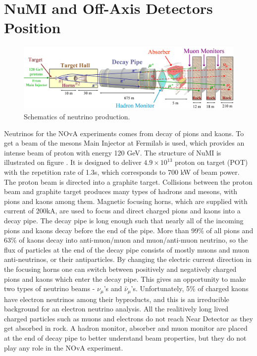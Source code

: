 \section{NuMI and Off-Axis Detectors Position}
\begin{figure}
\includegraphics[width=1.0\textwidth]{figures/Beamline.png}
\centering
\caption{Schematics of neutrino production\cite{numi}.} \label{NuMI}
\end{figure}
Neutrinos for the NOvA experiments comes from decay of pions and kaons. To get a beam of 
the mesons Main Injector at Fermilab is used, which provides an intense beam of proton with 
energy 120 GeV. The structure of NuMI is illustrated on figure . It is designed to 
deliver $4.9 \times 10^{13}$ proton on target (POT) with the repetition rate of 1.3s, which 
corresponds to 700 kW of beam power. The proton beam is directed into a graphite target.  
Collisions between the proton beam and graphite target produces many types of hadrons and 
mesons, with pions and kaons among them. Magnetic focusing horns, which are supplied with 
current of 200kA, are used to focus and direct 
charged pions and kaons into a decay pipe. The decay pipe is long enough such that nearly all 
of the incoming pions and kaons decay before the end of the pipe. More than 99\% of all pions 
and 63\% of kaons decay into anti-muon/muon and muon/anti-muon neutrino, so the flux of 
particles at the end of the decay pipe consists of mostly muons and muon anti-neutrinos, or 
their antiparticles. By changing the electric current direction in the focusing horns one can 
switch between positively and negatively charged pions and kaons which enter the decay pipe. 
This gives an opportunity to make two types of neutrino beams - $\nu_\mu$'s and $\bar{\nu}_\mu$'s. 
Unfortunately, 5\% of charged kaons have electron neutrinos among their byproducts, and this 
is an irreducible background for an electron neutrino analysis. All the realitively long lived
charged particles such as muons and electrons do not reach Near Detector as they get absorbed 
in rock. A hadron monitor, absorber and muon monitor are placed at the end of decay pipe 
to better understand beam properties, but they do not play any role in the NOvA experiment.

